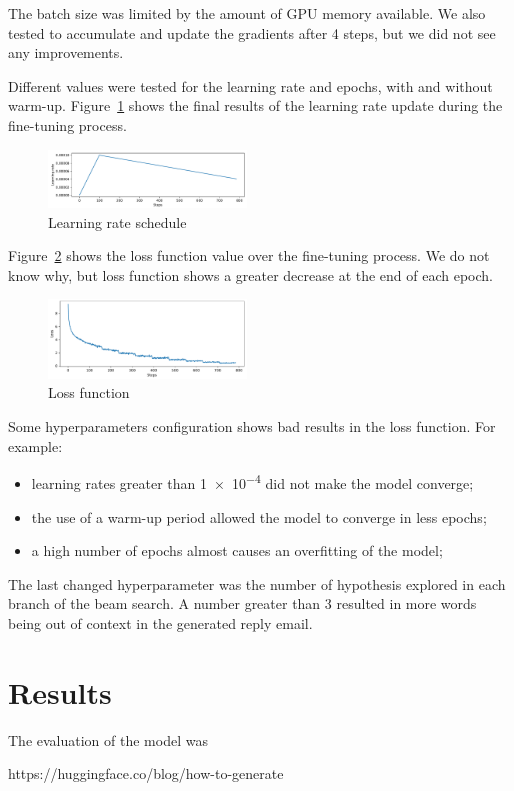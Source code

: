 \documentclass[letterpaper]{article}
\begin{document}
The batch size was limited by the amount of GPU memory available. We also tested to accumulate and update the gradients after \num{4} steps, but we did not see any improvements.

Different values were tested for the learning rate and epochs, with and without warm-up. Figure~\ref{fig:learning-rate-schedule} shows the final results of the learning rate update during the fine-tuning process.

\begin{figure}[ht]
    \centering
    \includegraphics[width=0.47\textwidth]{../images/warmup_linear_schedule.pdf}
    \caption{Learning rate schedule}
    \label{fig:learning-rate-schedule}
\end{figure}

Figure~\ref{fig:loss} shows the loss function value over the fine-tuning process. We do not know why, but loss function shows a greater decrease at the end of each epoch.

\begin{figure}[ht]
    \centering
    \includegraphics[width=0.47\textwidth]{../images/loss_function.pdf}
    \caption{Loss function}
    \label{fig:loss}
\end{figure}

Some hyperparameters configuration shows bad results in the loss function. For example:

\begin{itemize}
    \item learning rates greater than \num{1e-4} did not make the model converge;
    \item the use of a warm-up period allowed the model to converge in less epochs;
    \item a high number of epochs almost causes an overfitting of the model;
\end{itemize}

The last changed hyperparameter was the number of hypothesis explored in each branch of the beam search. A number greater than \num{3} resulted in more words being out of context in the generated reply email.


\section{Results}

The evaluation of the model was



https://huggingface.co/blog/how-to-generate





\end{document}
